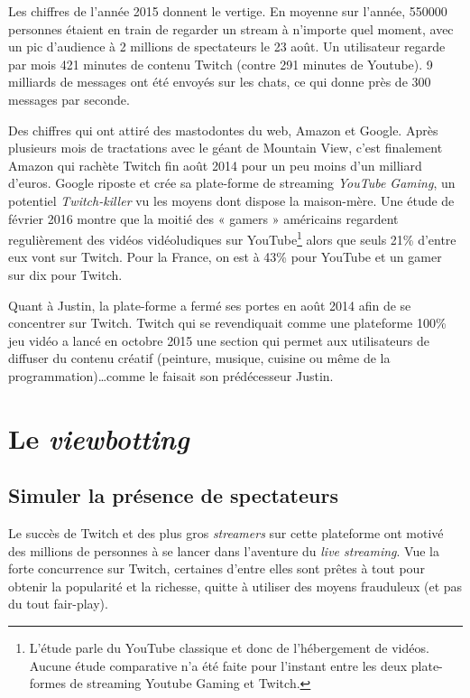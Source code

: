 \documentclass[a4paper]{article}
\begin{document}
Les chiffres de l'année 2015 donnent le vertige. En moyenne sur l'année, 550000 personnes étaient en train de regarder un stream à n'importe quel moment, avec un pic d'audience à 2 millions de spectateurs le 23 août. Un utilisateur regarde par mois 421 minutes de contenu Twitch (contre 291 minutes de Youtube). 9 milliards de messages ont été envoyés sur les chats, ce qui donne près de 300 messages par seconde\cite{Retro2015}.

Des chiffres qui ont attiré des mastodontes du web, Amazon et Google. Après plusieurs mois de tractations avec le géant de Mountain View, c'est finalement Amazon qui rachète Twitch fin août 2014 pour un peu moins d'un milliard d'euros. Google riposte et crée sa plate-forme de streaming \textit{YouTube Gaming}, un potentiel \textit{Twitch-killer} vu les moyens dont dispose la maison-mère\cite{Echos2015}. Une étude de février 2016 montre que la moitié des « gamers » américains regardent regulièrement des vidéos vidéoludiques sur YouTube\footnote{L'étude parle du YouTube classique et donc de l'hébergement de vidéos. Aucune étude comparative n'a été faite pour l'instant entre les deux plate-formes de streaming Youtube Gaming et Twitch.} alors que seuls 21\% d'entre eux vont sur Twitch. Pour la France, on est à 43\%  pour YouTube et un gamer sur dix pour Twitch\cite{Newzoo2016}. 

Quant à Justin, la plate-forme a fermé ses portes en août 2014 afin de se concentrer sur Twitch. Twitch qui se revendiquait comme une plateforme 100\% jeu vidéo a lancé en octobre 2015 une section qui permet aux utilisateurs de diffuser du contenu créatif (peinture, musique, cuisine ou même de la programmation)\ldots comme le faisait son prédécesseur Justin. 
\newpage 
\section{Le \textit{viewbotting}}

\subsection{Simuler la présence de spectateurs}

Le succès de Twitch et des plus gros \textit{streamers} sur cette plateforme ont motivé des millions de personnes à se lancer dans l'aventure du \textit{live streaming}. Vue la forte concurrence sur Twitch, certaines d'entre elles sont prêtes à tout pour obtenir la popularité et la richesse, quitte à utiliser des moyens frauduleux (et pas du tout fair-play).
\end{document}
